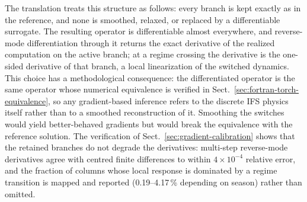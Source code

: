 The translation treats this structure as follows: every branch
is kept exactly as in the reference, and none is smoothed, relaxed, or
replaced by a differentiable surrogate.  The resulting operator is
differentiable almost everywhere, and reverse-mode differentiation through
it returns the exact derivative of the realized computation on the active
branch; at a regime crossing the derivative is the one-sided derivative of
that branch, a local linearization of the switched dynamics.  This choice
has a methodological consequence: the differentiated operator is the same
operator whose numerical equivalence is verified in
Sect.~\ref{sec:fortran-torch-equivalence}, so any gradient-based inference
refers to the discrete IFS physics itself rather than to a smoothed
reconstruction of it.  Smoothing the switches would yield better-behaved
gradients but would break the equivalence with the reference solution.  The
verification of Sect.~\ref{sec:gradient-calibration} shows that the
retained branches do not degrade the derivatives: multi-step reverse-mode
derivatives agree with centred finite differences to within
$4\times10^{-4}$ relative error, and the fraction of columns whose local
response is dominated by a regime transition is mapped and reported
(0.19--4.17\,\% depending on season) rather than omitted.
